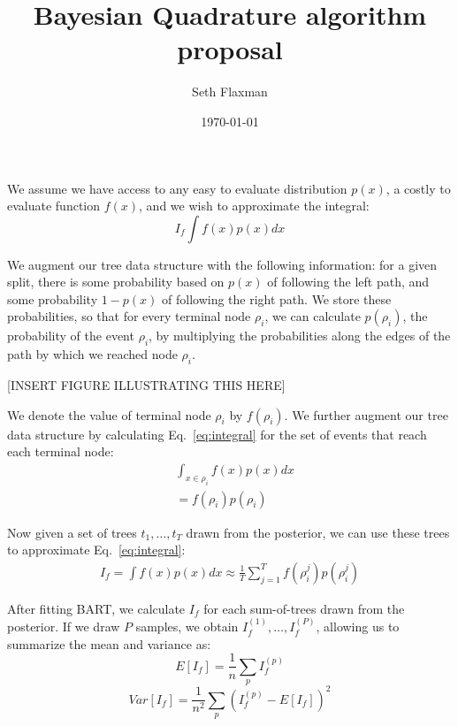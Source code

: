 \documentclass[12pt]{article}
\title{Bayesian Quadrature algorithm proposal}
\date{\today}
\author{Seth Flaxman}
\begin{document}
\maketitle 
We assume we have access to any easy to evaluate distribution $p(x)$, a costly to evaluate function $f(x)$,
and we wish to approximate the integral:
\begin{equation}
I_f \int f(x) p(x) dx
\label{eq:integral}
\end{equation}

We augment our tree data structure with the following information: 
for a given split, there is some probability
based on $p(x)$ of following the left path, and some probability $1-p(x)$ of following the right path. We store
these probabilities, so that for every terminal node $\rho_i$, we can calculate $p(\rho_i)$, the probability of the
event $\rho_i$, by multiplying the probabilities along the edges of the path by which we reached node $\rho_i$.

[INSERT FIGURE ILLUSTRATING THIS HERE]

We denote the value of terminal node $\rho_i$ by $f(\rho_i)$.
We further augment our tree data structure by calculating Eq.~\eqref{eq:integral} for the set of events that reach
each terminal node:
\begin{align}
& \int_{x \in \rho_i} f(x) p(x) dx \\
 &=  f(\rho_i) p(\rho_i)
\end{align}

Now given a set of trees $t_1, \ldots, t_T$ drawn from the posterior, we can use these trees to approximate
Eq.~\eqref{eq:integral}:
\begin{align}
I_f = \int f(x)p(x) dx \approx \frac{1}{T} \sum_{j=1}^T f(\rho_i^j) p(\rho_i^j)
\end{align}

After fitting BART, we calculate $I_f$ for each sum-of-trees drawn from the posterior.
If we draw $P$ samples, we obtain $I_f^{(1)}, \ldots, I_f^{(P)}$, allowing us to summarize
the mean and variance as:
\begin{equation}
E[I_f] = \frac{1}{n} \sum_p I_f^{(p)}
\end{equation}
\begin{equation}
Var[I_f] = \frac{1}{n^2} \sum_p (I_f^{(p)} - E[I_f])^2
\end{equation}
\end{document}
